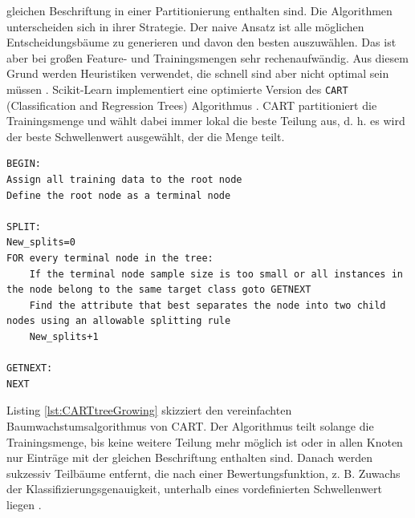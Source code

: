 gleichen Beschriftung in einer Partitionierung enthalten sind. Die Algorithmen unterscheiden sich in ihrer Strategie. Der naive Ansatz ist alle möglichen Entscheidungsbäume zu generieren und davon den besten auszuwählen.
Das ist aber bei großen Feature- und Trainingsmengen sehr rechenaufwändig. Aus diesem Grund werden Heuristiken verwendet, die schnell sind aber nicht optimal sein müssen \cite{quinlan1986induction}.
\newline
\newline
Scikit-Learn implementiert eine optimierte Version des \texttt{CART} (Classification and Regression Trees) Algorithmus \cite{ScikitLearnCART}.
CART partitioniert die Trainingsmenge und wählt dabei immer lokal die beste Teilung aus, d. h. es wird der beste Schwellenwert ausgewählt, der die Menge teilt.
\begin{lstlisting}[label=lst:CARTtreeGrowing,caption={Skizze von vereinfachten Baumwachstumsalgorithmus \cite{steinbergCART}.}]
BEGIN:
Assign all training data to the root node
Define the root node as a terminal node

SPLIT:
New_splits=0
FOR every terminal node in the tree:
    If the terminal node sample size is too small or all instances in the node belong to the same target class goto GETNEXT
    Find the attribute that best separates the node into two child nodes using an allowable splitting rule
    New_splits+1

GETNEXT:
NEXT
\end{lstlisting}
Listing \ref{lst:CARTtreeGrowing} skizziert den vereinfachten Baumwachstumsalgorithmus von CART. Der Algorithmus teilt solange die Trainingsmenge, bis keine weitere Teilung mehr möglich ist oder in allen Knoten nur
Einträge mit der gleichen Beschriftung enthalten sind. Danach werden sukzessiv Teilbäume entfernt, die nach einer Bewertungsfunktion, z. B. Zuwachs der Klassifizierungsgenauigkeit, unterhalb eines vordefinierten
Schwellenwert liegen \cite{steinbergCART}.